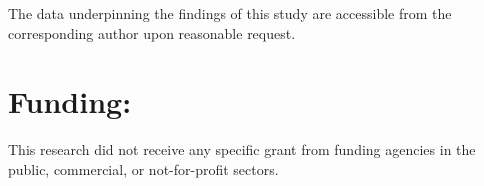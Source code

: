 \documentclass[a4paper,fleqn]{cas-sc}
\begin{document}
The data underpinning the findings of this study are accessible from the corresponding author upon reasonable request.

\section*{Funding:}
This research did not receive any specific grant from funding agencies in the public, commercial, or not-for-profit sectors.






\end{document}

